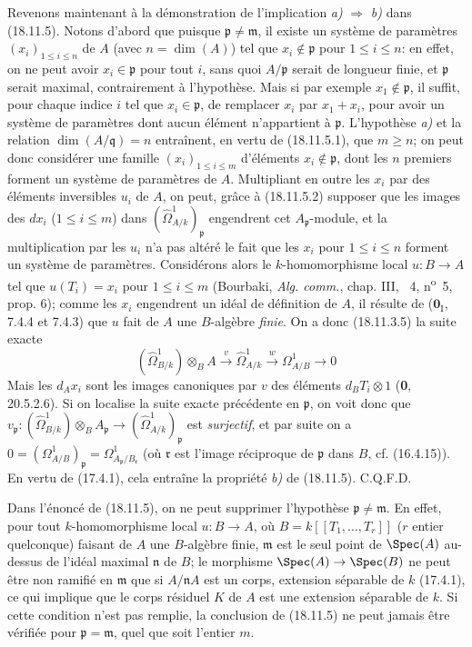 Revenons maintenant à la démonstration de l'implication \emph{a)} $\Rightarrow$ \emph{b)} dans (18.11.5). Notons d'abord que puisque $\mathfrak p\neq\mathfrak m$, il existe un système de paramètres $(x_i)_{1\leq i\leq n}$ de $A$ (avec $n=\dim(A)$) tel que $x_i\notin\mathfrak p$ pour $1\leq i\leq n$: en effet, on ne peut avoir $x_i\in\mathfrak p$ pour tout $i$, sans quoi $A/\mathfrak p$ serait de longueur finie, et $\mathfrak p$ serait maximal, contrairement à l'hypothèse. Mais si par exemple $x_1\notin\mathfrak p$, il suffit, pour chaque indice $i$ tel que $x_i\in\mathfrak p$, de remplacer $x_i$ par $x_1+x_i$, pour avoir un système de paramètres dont aucun élément n'appartient à $\mathfrak p$. L'hypothèse \emph{a)} et la relation $\dim(A/\mathfrak q)=n$ entraînent, en vertu de (18.11.5.1), que $m\geq n$; on peut donc considérer une famille $(x_i)_{1\leq i\leq m}$ d'éléments $x_i\notin\mathfrak p$, dont les $n$ premiers forment un système de paramètres de $A$. Multipliant en outre les $x_i$ par des éléments inversibles $u_i$ de $A$, on peut, grâce à (18.11.5.2) supposer que les images des $dx_i$ ($1\leq i\leq m$) dans $(\hat{\Omega}^1_{A/k})_{\mathfrak p}$ engendrent cet $A_{\mathfrak p}$-module, et la multiplication par les $u_i$ n'a pas altéré le fait que les $x_i$ pour $1\leq i\leq n$ forment un système de paramètres.
Considérons alors le $k$-homomorphisme local $u:B\to A$ tel que $u(T_i)=x_i$ pour $1\leq i\leq m$ (Bourbaki, \emph{Alg. comm.}, chap. III, \textsection~4, n\textsuperscript{o}~5, prop. 6); comme les $x_i$ engendrent un idéal de définition de $A$, il résulte de ($\mathbf{0}_{\mathrm I}$, 7.4.4 et 7.4.3) que $u$ fait de $A$ une $B$-algèbre \emph{finie}. On a donc (18.11.3.5) la suite exacte
\[
  (\hat{\Omega}^1_{B/k})\otimes_B A\xrightarrow{v}\hat{\Omega}^1_{A/k}\xrightarrow{w}\Omega^1_{A/B}\longrightarrow0
\]
Mais les $d_Ax_i$ sont les images canoniques par $v$ des éléments $d_BT_i\otimes1$ (\textbf{0}, 20.5.2.6). Si on localise la suite exacte précédente en $\mathfrak p$, on voit donc que $v_{\mathfrak p}:(\hat{\Omega}^1_{B/k})\otimes_B A_{\mathfrak p}\to(\hat{\Omega}^1_{A/k})_{\mathfrak p}$ est \emph{surjectif}, et par suite on a $0=(\Omega^1_{A/B})_{\mathfrak p}=\Omega^1_{A_{\mathfrak p}/B_{\mathfrak r}}$ (où $\mathfrak r$ est l'image réciproque de $\mathfrak p$ dans $B$, cf. (16.4.15)). En vertu de (17.4.1), cela entraîne la propriété \emph{b)} de (18.11.5). C.Q.F.D.

\begin{remark}[18.11.6]
\label{IV.18.11.6}
Dans l'énoncé de (18.11.5), on ne peut supprimer l'hypothèse $\mathfrak p\neq\mathfrak m$. En effet, pour tout $k$-homomorphisme local $u:B\to A$, où $B=k[[T_1,\ldots,T_r]]$ ($r$ entier quelconque) faisant de $A$ une $B$-algèbre finie, $\mathfrak m$ est le seul point de $\Spec(A)$ au-dessus de l'idéal maximal $\mathfrak n$ de $B$; le morphisme $\Spec(A)\to\Spec(B)$ ne peut être non ramifié en $\mathfrak m$ que si $A/\mathfrak nA$ est un corps, extension séparable de $k$ (17.4.1), ce qui implique que le corps résiduel $K$ de $A$ est une extension séparable de $k$. Si cette condition n'est pas remplie, la conclusion de (18.11.5) ne peut jamais être vérifiée pour $\mathfrak p=\mathfrak m$, quel que soit l'entier $m$.
\end{remark}

